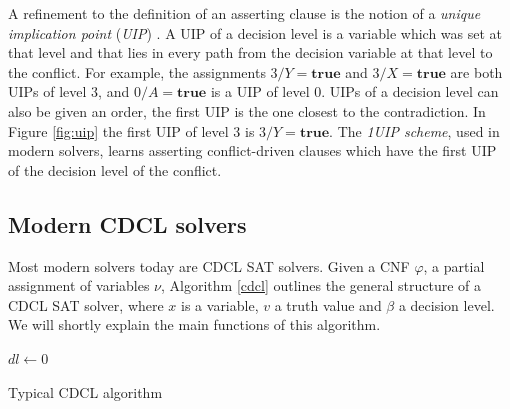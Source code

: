 \documentclass[12pt]{diicc}
\begin{document}
A refinement to the definition of an asserting clause is the notion of a \textit{unique implication point} (\textit{UIP}) \cite{grasp,cdcl1}. A UIP of a decision level is a variable which was set at that level and that lies in every path from the decision variable at that level to the conflict. For example, the assignments $3/Y=\textbf{true}$ and $3/X=\textbf{true}$ are both UIPs of level 3, and $0/A=\textbf{true}$ is a UIP of level 0. UIPs of a decision level can also be given an order, the first UIP is the one closest to the contradiction. In Figure \ref{fig:uip} the first UIP of level 3 is $3/Y=\textbf{true}$. The \textit{1UIP scheme}, used in modern solvers, learns asserting conflict-driven clauses which have the first UIP of the decision level of the conflict. 

\subsection{Modern CDCL solvers}

Most modern solvers today are CDCL SAT solvers. Given a CNF $\varphi$, a partial assignment of variables $\nu$, Algorithm \ref{cdcl} outlines the general structure of a CDCL SAT solver, where $x$ is a variable, $v$ a truth value and $\beta$ a decision level. We will shortly explain the main functions of this algorithm.

\begin{algorithm}
$dl \leftarrow 0$\\
\caption{Typical CDCL algorithm\label{cdcl}}
\end{algorithm}
\end{document}
